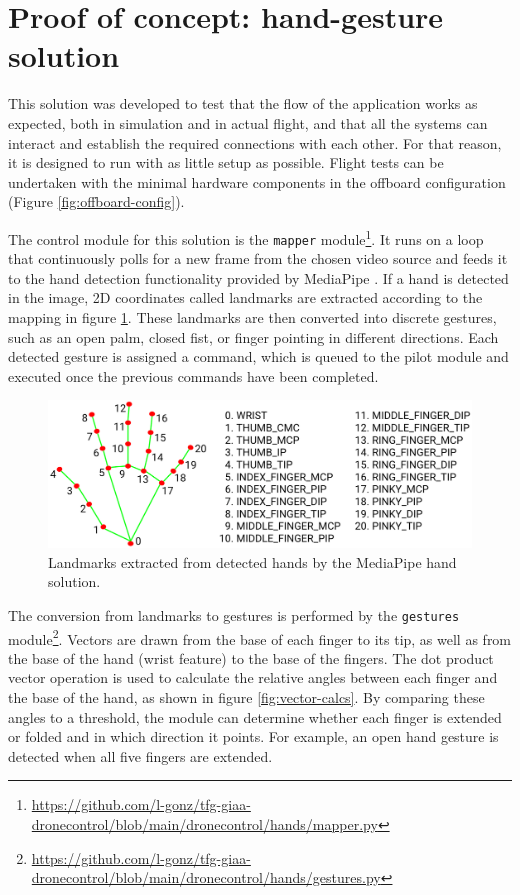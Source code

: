 \section{Proof of concept: hand-gesture solution}
\label{sec:hands}
This solution was developed to test that the flow of the application works as expected, both in simulation and in actual flight, and that all the systems can interact and establish the required connections with each other.
For that reason, it is designed to run with as little setup as possible. Flight tests can be undertaken with the minimal hardware components in the offboard configuration (Figure \ref{fig:offboard-config}).

The control module for this solution is the \texttt{mapper} module\footnote{\url{https://github.com/l-gonz/tfg-giaa-dronecontrol/blob/main/dronecontrol/hands/mapper.py}}.
It runs on a loop that continuously polls for a new frame from the chosen video source and feeds it to the hand detection functionality provided by MediaPipe \cite{mp-hands-paper}.
If a hand is detected in the image, 2D coordinates called landmarks are extracted according to the mapping in figure \ref{fig:hand-landmarks}.
These landmarks are then converted into discrete gestures, such as an open palm, closed fist, or finger pointing in different directions. Each detected gesture is assigned a command, which is queued to the pilot module and executed once the previous commands have been completed.

\begin{figure}
  \centering
  \includegraphics[width=\textwidth, keepaspectratio]{img/hand_landmarks.png}
  \caption{Landmarks extracted from detected hands by the MediaPipe hand solution.}
  \label{fig:hand-landmarks}
\end{figure}

The conversion from landmarks to gestures is performed by the \texttt{gestures} module\footnote{\url{https://github.com/l-gonz/tfg-giaa-dronecontrol/blob/main/dronecontrol/hands/gestures.py}}. Vectors are drawn from the base of each finger to its tip, as well as from the base of the hand (wrist feature) to the base of the fingers. The dot product vector operation is used to calculate the relative angles between each finger and the base of the hand, as shown in figure \ref{fig:vector-calcs}. By comparing these angles to a threshold, the module can determine whether each finger is extended or folded and in which direction it points. For example, an open hand gesture is detected when all five fingers are extended.

